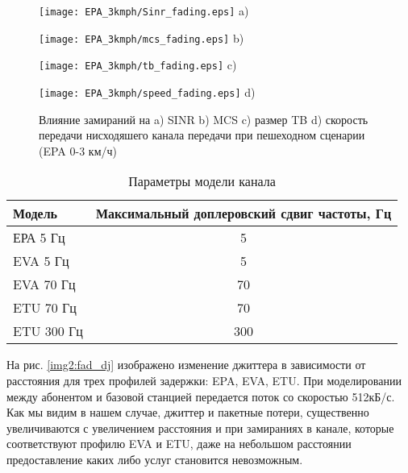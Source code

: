 \begin{figure} [!h]
\begin{minipage}[h]{0.47\linewidth}
\center
\texttt{[image: EPA\_3kmph/Sinr\_fading.eps]} a) \\
\end{minipage}
\hfill
\begin{minipage}[h]{0.47\linewidth}
\center
\texttt{[image: EPA\_3kmph/mcs\_fading.eps]} b) \\
\end{minipage}
\vfill
\begin{minipage}[h]{0.47\linewidth}
\center
\texttt{[image: EPA\_3kmph/tb\_fading.eps]} c) \\
\end{minipage}
\hfill
\begin{minipage}[h]{0.47\linewidth}
\center
\texttt{[image: EPA\_3kmph/speed\_fading.eps]} d) \\
\end{minipage}
\caption{Влияние замираний на a) SINR b) MCS c) размер TB d) скорость передачи нисходяшего канала передачи при пешеходном сценарии (EPA 0-3 км/ч)}
\label{img:EPA_3kmph}
\end{figure}


\begin{table} [!htb]
  \centering
\parbox{15cm}{\caption{Параметры модели канала \cite{iks}}\label{model_chanel}}
\begin{tabular}{|l|c|}
    \hline
    \hline
    Модель     & Максимальный доплеровский сдвиг частоты, Гц \\ \hline \hline
    ЕРА 5 Гц   & 5                                       \\ \hline
    EVA 5 Гц   & 5                                       \\ \hline
    EVA 70 Гц  & 70                                      \\ \hline
    ETU 70 Гц  & 70                                      \\ \hline
    ETU 300 Гц & 300                                     \\ \hline
    \end{tabular}
\end{table}

На рис. \ref{img2:fad_dj} изображено изменение джиттера в зависимости от расстояния для трех профилей задержки: EPA, EVA, ETU. 
При моделировании между абонентом и базовой станцией передается поток со скоростью 512кБ/с. Как мы видим в нашем случае, джиттер и пакетные потери, существенно увеличиваются с увеличением расстояния и при замираниях в канале, которые соответствуют профилю EVA и ETU, даже на небольшом расстоянии предоставление каких либо услуг становится невозможным.


